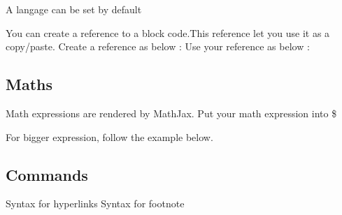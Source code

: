 A langage can be set by default
\code{{{
  \set[defaultcodelanguage=python]
}}}

You can create a reference to a block code.This reference
let you use it as a copy/paste.
Create a reference as below :
Use your reference as below :

\subsection{Maths}
Math expressions are rendered by MathJax.
Put your math expression into \$

For bigger expression, follow the example below.
\code{{{
  \[
   \left \{ \begin[t]{array}{l}
              0!=1 \\
              n! = n \times (n-1)! \text{ for } n>0
            \end{array} \right.
  \]
}}}

\subsection{Commands}
Syntax for hyperlinks
Syntax for footnote
